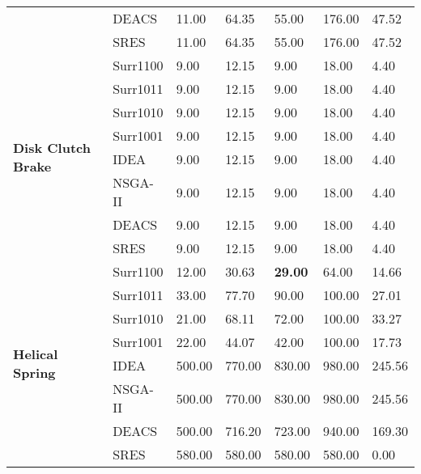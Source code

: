 \begin{table*}[!htb]
\begin{tabular}{lllllll}
		& DEACS         & 11.00         & 64.35         & 55.00           & 176.00         & 47.52        \\ 
		& SRES          & 11.00         & 64.35         & 55.00           & 176.00         & 47.52        \\ \hline
		\multirow{8}{*}{\textbf{Disk Clutch Brake}} & Surr1100      & 9.00          & 12.15         & 9.00            & 18.00          & 4.40         \\ 
		& Surr1011      & 9.00          & 12.15         & 9.00            & 18.00          & 4.40         \\ 
		& Surr1010      & 9.00          & 12.15         & 9.00            & 18.00          & 4.40         \\ 
		& Surr1001      & 9.00          & 12.15         & 9.00            & 18.00          & 4.40         \\  
		& IDEA          & 9.00          & 12.15         & 9.00            & 18.00          & 4.40         \\
		& NSGA-II       & 9.00          & 12.15         & 9.00            & 18.00          & 4.40         \\  
		& DEACS         & 9.00          & 12.15         & 9.00            & 18.00          & 4.40         \\  
		& SRES          & 9.00          & 12.15         & 9.00            & 18.00          & 4.40         \\ \hline
		\multirow{8}{*}{\textbf{Helical Spring}}    & Surr1100      & 12.00         & 30.63         & \textbf{29.00}  & 64.00          & 14.66        \\  
		& Surr1011      & 33.00         & 77.70         & 90.00           & 100.00         & 27.01        \\  
		& Surr1010      & 21.00         & 68.11         & 72.00           & 100.00         & 33.27        \\ 
		& Surr1001      & 22.00         & 44.07         & 42.00           & 100.00         & 17.73        \\  
		& IDEA          & 500.00        & 770.00        & 830.00          & 980.00         & 245.56       \\ 
		& NSGA-II       & 500.00        & 770.00        & 830.00          & 980.00         & 245.56       \\ 
		& DEACS         & 500.00        & 716.20        & 723.00          & 940.00         & 169.30       \\ 
		& SRES          & 580.00        & 580.00        & 580.00          & 580.00         & 0.00         \\ \hline

\end{tabular}
\end{table*}
